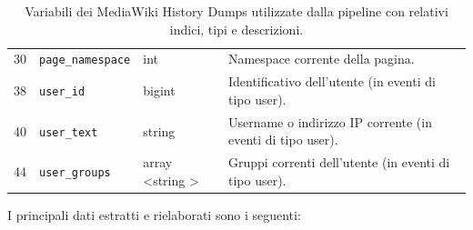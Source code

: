 \begin{table}[h]
\begin{tabular}{|c|l|l|p{8cm}|}
30 & \texttt{page\_namespace} & int & Namespace corrente della pagina. \\
38 & \texttt{user\_id} & bigint & Identificativo dell’utente (in eventi di tipo user). \\
40 & \texttt{user\_text} & string & Username o indirizzo IP corrente (in eventi di tipo user). \\
44 & \texttt{user\_groups} & array \textless string \textgreater & Gruppi correnti dell’utente (in eventi di tipo user). \\
\hline
\end{tabular}
\caption{Variabili dei MediaWiki History Dumps utilizzate dalla pipeline con relativi indici, tipi e descrizioni.}
\label{tab:dump_variables_selected}
\end{table}


I principali dati estratti e rielaborati sono i seguenti:

